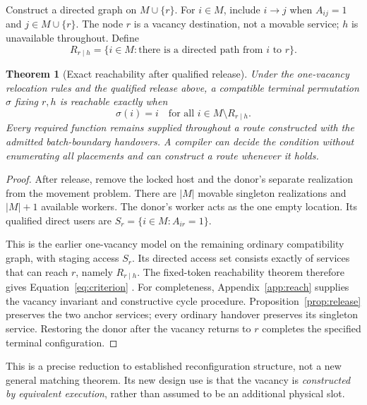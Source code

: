 \documentclass[11pt,letterpaper]{article}
\newtheorem{theorem}{Theorem}[section]
\theoremstyle{definition}\newtheorem{definition}[theorem]{Definition}
\theoremstyle{remark}\newtheorem{remark}[theorem]{Remark}
\begin{document}
Construct a directed graph on $M\cup\{r\}$. For $i\in M$, include $i\to j$ when $A_{ij}=1$ and $j\in M\cup\{r\}$. The node $r$ is a vacancy destination, not a movable service; $h$ is unavailable throughout. Define
\begin{equation}
 R_{r\mid h}=\{i\in M:\text{there is a directed path from }i\text{ to }r\}.
 \label{eq:access}
\end{equation}

\begin{theorem}[Exact reachability after qualified release]
\label{thm:reach}
Under the one-vacancy relocation rules and the qualified release above, a compatible terminal permutation $\sigma$ fixing $r,h$ is reachable exactly when
\begin{equation}
 \boxed{\qquad \sigma(i)=i\quad\text{for all }i\in M\setminus R_{r\mid h}.\qquad}
 \label{eq:criterion}
\end{equation}
Every required function remains supplied throughout a route constructed with the admitted batch-boundary handovers. A compiler can decide the condition without enumerating all placements and can construct a route whenever it holds.
\end{theorem}
\begin{proof}
After release, remove the locked host and the donor's separate realization from the movement problem. There are $|M|$ movable singleton realizations and $|M|+1$ available workers. The donor's worker acts as the one empty location. Its qualified direct users are $S_r=\{i\in M:A_{ir}=1\}$.

This is the earlier one-vacancy model on the remaining ordinary compatibility graph, with staging access $S_r$. Its directed access set consists exactly of services that can reach $r$, namely $R_{r\mid h}$. The fixed-token reachability theorem therefore gives Equation~\eqref{eq:criterion} \citep{design1}. For completeness, Appendix~\ref{app:reach} supplies the vacancy invariant and constructive cycle procedure. Proposition~\ref{prop:release} preserves the two anchor services; every ordinary handover preserves its singleton service. Restoring the donor after the vacancy returns to $r$ completes the specified terminal configuration.
\end{proof}

This is a precise reduction to established reconfiguration structure, not a new general matching theorem. Its new design use is that the vacancy is \emph{constructed by equivalent execution}, rather than assumed to be an additional physical slot.
\end{document}
